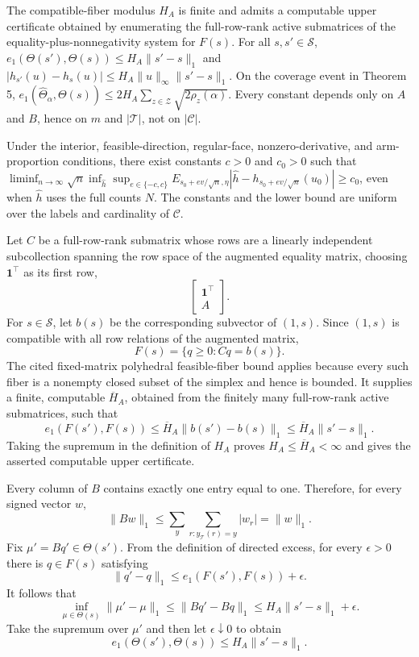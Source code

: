 The compatible-fiber modulus \(H_A\) is finite and admits a computable upper certificate obtained by enumerating the full-row-rank active submatrices of the equality-plus-nonnegativity system for \(F(s)\). For all \(s,s'\in\mathcal S\), \(e_1(\Theta(s'),\Theta(s))\le H_A\|s'-s\|_1\) and \(|h_{s'}(u)-h_s(u)|\le H_A\|u\|_\infty\|s'-s\|_1\). On the coverage event in Theorem 5, \(e_1(\widehat\Theta_\alpha,\Theta(s))\le2H_A\sum_{z\in\mathcal Z}\sqrt{2\rho_z(\alpha)}\). Every constant depends only on \(A\) and \(B\), hence on \(m\) and \(|\mathcal T|\), not on \(|\mathcal C|\).

Under the interior, feasible-direction, regular-face, nonzero-derivative, and arm-proportion conditions, there exist constants \(c>0\) and \(c_0>0\) such that \(\liminf_{n\to\infty}\sqrt n\inf_{\widehat h}\sup_{e\in\{-c,c\}}E_{s_0+ev/\sqrt n,\eta}|\widehat h-h_{s_0+ev/\sqrt n}(u_0)|\ge c_0\), even when \(\widehat h\) uses the full counts \(N\). The constants and the lower bound are uniform over the labels and cardinality of \(\mathcal C\).

Let \(C\) be a full-row-rank submatrix whose rows are a linearly independent subcollection spanning the row space of the augmented equality matrix, choosing \(\mathbf 1^\top\) as its first row,
\[
\begin{bmatrix}\mathbf 1^\top\\ A\end{bmatrix}.
\]
For \(s\in\mathcal S\), let \(b(s)\) be the corresponding subvector of \((1,s)\).  Since \((1,s)\) is compatible with all row relations of the augmented matrix,
\[
F(s)=\{q\ge0:Cq=b(s)\}.
\]
The cited fixed-matrix polyhedral feasible-fiber bound applies because every such fiber is a nonempty closed subset of the simplex and hence is bounded.  It supplies a finite, computable \(\overline H_A\), obtained from the finitely many full-row-rank active submatrices, such that
\[
e_1(F(s'),F(s))
\le\overline H_A\|b(s')-b(s)\|_1
\le\overline H_A\|s'-s\|_1.
\]
Taking the supremum in the definition of \(H_A\) proves \(H_A\le\overline H_A<\infty\) and gives the asserted computable upper certificate.

Every column of \(B\) contains exactly one entry equal to one.  Therefore, for every signed vector \(w\),
\[
\|Bw\|_1
\le\sum_y\sum_{r:y_{\mathcal T}(r)=y}|w_r|
=\|w\|_1.
\]
Fix \(\mu'=Bq'\in\Theta(s')\).  From the definition of directed excess, for every \(\epsilon>0\) there is \(q\in F(s)\) satisfying
\[
\|q'-q\|_1
\le e_1(F(s'),F(s))+\epsilon.
\]
It follows that
\[
\inf_{\mu\in\Theta(s)}\|\mu'-\mu\|_1
\le\|Bq'-Bq\|_1
\le H_A\|s'-s\|_1+\epsilon.
\]
Take the supremum over \(\mu'\) and then let \(\epsilon\downarrow0\) to obtain
\[
e_1(\Theta(s'),\Theta(s))\le H_A\|s'-s\|_1.
\]

